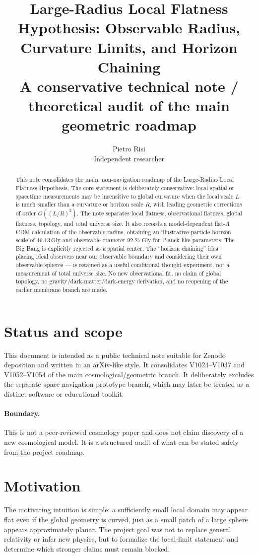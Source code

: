 \documentclass[11pt,a4paper]{article}
\title{\textbf{Large-Radius Local Flatness Hypothesis: Observable Radius, Curvature Limits, and Horizon Chaining}\\
\large A conservative technical note / theoretical audit of the main geometric roadmap}
\author{Pietro Risi\\
\small Independent researcher}
\date{}
\newcommand{\Gly}{\,\mathrm{Gly}}
\begin{document}
\maketitle

\begin{abstract}
This note consolidates the main, non-navigation roadmap of the Large-Radius Local Flatness Hypothesis. The core statement is deliberately conservative: local spatial or spacetime measurements may be insensitive to global curvature when the local scale $L$ is much smaller than a curvature or horizon scale $R$, with leading geometric corrections of order $O((L/R)^2)$. The note separates local flatness, observational flatness, global flatness, topology, and total universe size. It also records a model-dependent flat-$\Lambda$CDM calculation of the observable radius, obtaining an illustrative particle-horizon scale of $46.13\Gly$ and observable diameter $92.27\Gly$ for Planck-like parameters. The Big Bang is explicitly rejected as a spatial center. The ``horizon chaining'' idea --- placing ideal observers near our observable boundary and considering their own observable spheres --- is retained as a useful conditional thought experiment, not a measurement of total universe size. No new observational fit, no claim of global topology, no gravity/dark-matter/dark-energy derivation, and no reopening of the earlier membrane branch are made.
\end{abstract}

\section*{Status and scope}
This document is intended as a public technical note suitable for Zenodo deposition and written in an arXiv-like style. It consolidates V1024--V1037 and V1052--V1054 of the main cosmological/geometric branch. It deliberately excludes the separate space-navigation prototype branch, which may later be treated as a distinct software or educational toolkit.

\paragraph{Boundary.} This is not a peer-reviewed cosmology paper and does not claim discovery of a new cosmological model. It is a structured audit of what can be stated safely from the project roadmap.

\section{Motivation}
The motivating intuition is simple: a sufficiently small local domain may appear flat even if the global geometry is curved, just as a small patch of a large sphere appears approximately planar. The project goal was not to replace general relativity or infer new physics, but to formalize the local-limit statement and determine which stronger claims must remain blocked.
\end{document}
